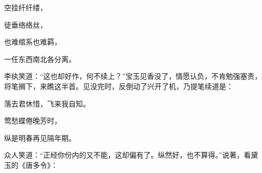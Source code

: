 \begin{poem}
    \begin{pl}

        空挂纤纤缕，
    \end{pl}
    \begin{pl}

        徒垂络络丝，
    \end{pl}
    \begin{pl}

        也难绾系也难羁，
    \end{pl}
    \begin{pl}

        一任东西南北各分离。
    \end{pl}
\end{poem}


\begin{parag}
    李纨笑道：“这也却好作，何不续上？”宝玉见香没了，情愿认负，不肯勉强塞责，将笔搁下，来瞧这半首。见没完时，反倒动了兴开了机，乃提笔续道是：
\end{parag}


\begin{poem}
    \begin{pl}

        落去君休惜，飞来我自知。
    \end{pl}
    \begin{pl}

        莺愁蝶倦晚芳时，
    \end{pl}
    \begin{pl}

        纵是明春再见隔年期。
    \end{pl}
\end{poem}


\begin{parag}
    众人笑道：“正经你份内的又不能，这却偏有了。纵然好，也不算得。”说著，看黛玉的《唐多令》：
\end{parag}


